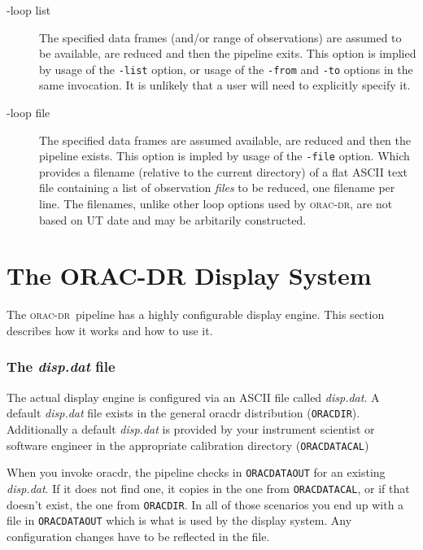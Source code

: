 \documentclass[twoside,11pt]{article}
\newcommand{\xlabel}[1]{}
\renewcommand{\_}{\texttt{\symbol{95}}}
\newcommand{\oracdr}{\textsc{orac-dr}}
\begin{document}
\begin{description}
\item[-loop list] \mbox{}

The specified data frames (and/or range of observations) are assumed
to be available, are reduced and then the pipeline exits. This option
is implied by usage of the \texttt{-list} option, or usage of the \texttt{-from}
and \texttt{-to} options in the same invocation. It is unlikely that a user
will need to explicitly specify it.

\item[-loop file] \mbox{}

The specified data frames are assumed available, are reduced and then
the pipeline exists. This option is impled by usage of the \texttt{-file}
option. Which provides a filename (relative to the current directory) of
a flat ASCII text file containing a list of observation \textit{files} to be 
reduced, one filename per line. The filenames, unlike other loop options
used by \oracdr, are not based on UT date and may be arbitarily constructed.

\end{description}

\section{\xlabel{display_system}The ORAC-DR Display System\label{The_ORAC-DR_Display_System}}

The \oracdr\ pipeline has a highly configurable display engine. This
section describes how it works and how to use it.

\subsubsection*{The \emph{disp.dat} file\label{The_ORAC-DR_Display_System_The_disp_dat_file}}

The actual display engine is configured via an ASCII file called
\emph{disp.dat}. A default \emph{disp.dat} file exists in the general oracdr
distribution (\texttt{ORAC\_DIR}). Additionally a default \emph{disp.dat} is provided
by your instrument scientist or software engineer in the appropriate
calibration directory (\texttt{ORAC\_DATA\_CAL})



When you invoke oracdr, the pipeline checks in \texttt{ORAC\_DATA\_OUT} for an
existing \emph{disp.dat}. If it does not find one, it copies in the one from
\texttt{ORAC\_DATA\_CAL}, or if that doesn't exist, the one from \texttt{ORAC\_DIR}. In
all of those scenarios you end up with a file in \texttt{ORAC\_DATA\_OUT} which
is what is used by the display system. Any configuration changes have
to be reflected in the file.
\end{document}
